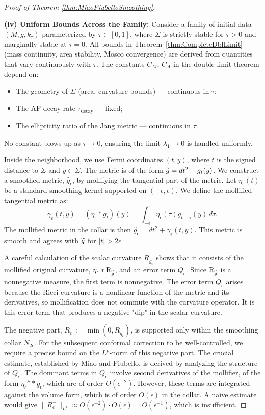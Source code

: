 \begin{proof}[Proof of Theorem \ref{thm:MiaoPiubelloSmoothing}]
\begin{remark}
\textbf{(iv) Uniform Bounds Across the Family:} Consider a family of initial data $(M, g, k_\tau)$ parameterized by $\tau \in [0,1]$, where $\Sigma$ is strictly stable for $\tau > 0$ and marginally stable at $\tau = 0$. All bounds in Theorem~\ref{thm:CompleteDblLimit} (mass continuity, area stability, Mosco convergence) are derived from quantities that vary continuously with $\tau$. The constants $C_M$, $C_A$ in the double-limit theorem depend on:
\begin{itemize}
    \item The geometry of $\Sigma$ (area, curvature bounds) --- continuous in $\tau$;
    \item The AF decay rate $\tau_{\text{decay}}$ --- fixed;
    \item The ellipticity ratio of the Jang metric --- continuous in $\tau$.
\end{itemize}
No constant blows up as $\tau \to 0$, ensuring the limit $\lambda_1 \to 0$ is handled uniformly.
\end{remark}

Inside the neighborhood, we use Fermi coordinates $(t, y)$, where $t$ is the signed distance to $\Sigma$ and $y \in \Sigma$. The metric is of the form $\widetilde{g} = dt^2 + g_t(y)$. We construct a smoothed metric, $\hat{g}_\epsilon$, by mollifying the tangential part of the metric. Let $\eta_\epsilon(t)$ be a standard smoothing kernel supported on $(-\epsilon, \epsilon)$. We define the mollified tangential metric as:
\[ \gamma_\epsilon(t, y) = (\eta_\epsilon * g_t)(y) = \int_{-\epsilon}^{\epsilon} \eta_\epsilon(\tau) g_{t-\tau}(y) \, d\tau. \]
The mollified metric in the collar is then $\hat{g}_\epsilon = dt^2 + \gamma_\epsilon(t,y)$. This metric is smooth and agrees with $\widetilde{g}$ for $|t| > 2\epsilon$.

A careful calculation of the scalar curvature $R_{\hat{g}_\epsilon}$ shows that it consists of the mollified original curvature, $\eta_\epsilon * \mathrm{R}_{\widetilde{g}}$, and an error term $Q_\epsilon$. Since $\mathrm{R}_{\widetilde{g}}$ is a nonnegative measure, the first term is nonnegative. The error term $Q_\epsilon$ arises because the Ricci curvature is a nonlinear function of the metric and its derivatives, so mollification does not commute with the curvature operator. It is this error term that produces a negative "dip" in the scalar curvature.

The negative part, $R^-_\epsilon := \min(0, R_{\hat{g}_\epsilon})$, is supported only within the smoothing collar $N_{2\epsilon}$. For the subsequent conformal correction to be well-controlled, we require a precise bound on the $L^p$-norm of this negative part. The crucial estimate, established by Miao and Piubello, is derived by analyzing the structure of $Q_\epsilon$. The dominant terms in $Q_\epsilon$ involve second derivatives of the mollifier, of the form $\eta_\epsilon'' * g_t$, which are of order $O(\epsilon^{-2})$. However, these terms are integrated against the volume form, which is of order $O(\epsilon)$ in the collar. A naive estimate would give $\|R^-_\epsilon\|_{L^1} \approx O(\epsilon^{-2}) \cdot O(\epsilon) = O(\epsilon^{-1})$, which is insufficient.


\end{proof}
